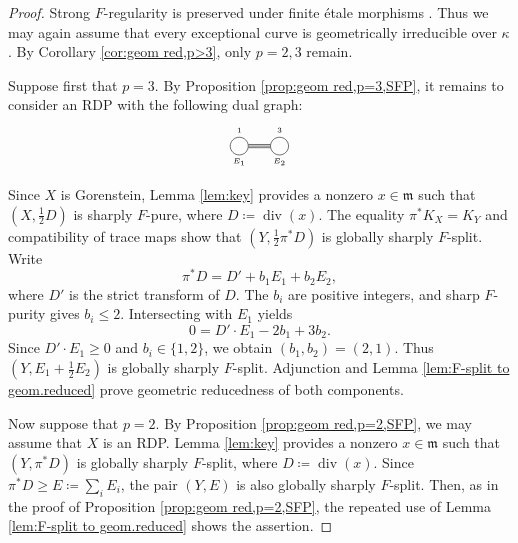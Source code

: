 \documentclass[12pt]{amsart}
\def\m{{\mathfrak m}}
\theoremstyle{plain}
\theoremstyle{definition}
\theoremstyle{remark}
\newtheorem{defn and notation}[thm]{Definition and Notation}
\theoremstyle{plain}
\numberwithin{equation}{thm}
\begin{document}
\begin{proof}
    Strong $F$-regularity is preserved under finite \'etale morphisms \cite[Theorem 4.8]{Hara-Watanabe}.
    Thus we may again assume that every exceptional curve is geometrically irreducible over $\kappa$.
    By Corollary \ref{cor:geom red,p>3}, only $p=2,3$ remain.

    Suppose first that $p=3$.
    By Proposition \ref{prop:geom red,p=3,SFP}, it remains to consider an RDP with the following dual graph:
    \[
\begin{tikzpicture}
\node[draw, shape=circle, inner sep=4.5pt] (E1) at (3,0){};
\node[draw, shape=circle, inner sep=4.5pt] (E2) at (4,0){};
\draw[shift={(0,0.4)}] (3,0) node{\tiny $1$};
\draw[shift={(0,0.4)}] (4,0) node{\tiny $3$};
\draw[shift={(0,-0.4)}] (3,0) node{\tiny $E_1$};
\draw[shift={(0,-0.4)}] (4,0) node{\tiny $E_2$};

\draw (E1)--(E2);
\draw (E1.10)--(E2.170);
\draw (E1.-10)--(E2.-170);
\end{tikzpicture}
    \]
    Since $X$ is Gorenstein, Lemma \ref{lem:key} provides a nonzero $x\in\m$ such that $(X,\frac12 D)$ is sharply $F$-pure, where $D\coloneqq\operatorname{div}(x)$.
    The equality $\pi^*K_X=K_Y$ and compatibility of trace maps show that $(Y,\frac12\pi^*D)$ is globally sharply $F$-split.
    Write
    \[
    \pi^*D=D'+b_1E_1+b_2E_2,
    \]
    where $D'$ is the strict transform of $D$.
    The $b_i$ are positive integers, and sharp $F$-purity gives $b_i\leq2$.
    Intersecting with $E_1$ yields
    \[
    0=D'\cdot E_1-2b_1+3b_2.
    \]
    Since $D'\cdot E_1\geq0$ and $b_i\in\{1,2\}$, we obtain $(b_1,b_2)=(2,1)$.
    Thus $(Y,E_1+\frac12 E_2)$ is globally sharply $F$-split.
    Adjunction and Lemma \ref{lem:F-split to geom.reduced} prove geometric reducedness of both components.

    Now suppose that $p=2$.
    By Proposition \ref{prop:geom red,p=2,SFP}, we may assume that $X$ is an RDP.
    Lemma \ref{lem:key} provides a nonzero $x\in\m$ such that $(Y,\pi^*D)$ is globally sharply $F$-split, where $D\coloneqq\operatorname{div}(x)$.
    Since $\pi^*D\geq E\coloneqq\sum_i E_i$, the pair $(Y,E)$ is also globally sharply $F$-split.
    Then, as in the proof of Proposition \ref{prop:geom red,p=2,SFP}, the repeated use of Lemma \ref{lem:F-split to geom.reduced} shows the assertion.
\end{proof}
\end{document}
